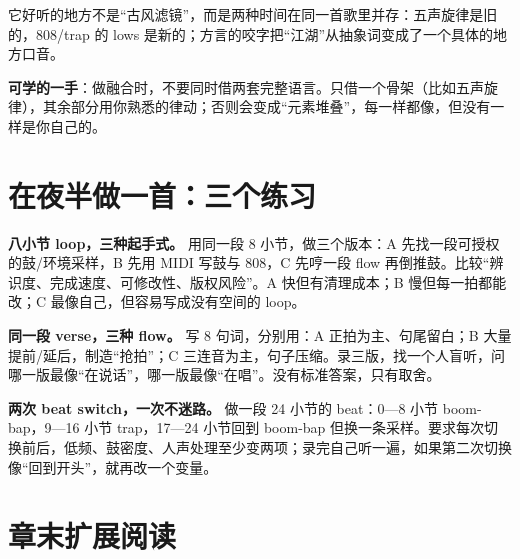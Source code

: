 它好听的地方不是“古风滤镜”，而是两种时间在同一首歌里并存：五声旋律是旧的，808/trap 的 lows 是新的；方言的咬字把“江湖”从抽象词变成了一个具体的地方口音。

\textbf{可学的一手}：做融合时，不要同时借两套完整语言。只借一个骨架（比如五声旋律），其余部分用你熟悉的律动；否则会变成“元素堆叠”，每一样都像，但没有一样是你自己的。

\section{在夜半做一首：三个练习}
\label{sec:hiphop-practice}

\begin{exercise}
\textbf{八小节 loop，三种起手式。} 用同一段 8 小节，做三个版本：A 先找一段可授权的鼓/环境采样，B 先用 MIDI 写鼓与 808，C 先哼一段 flow 再倒推鼓。比较“辨识度、完成速度、可修改性、版权风险”。A 快但有清理成本；B 慢但每一拍都能改；C 最像自己，但容易写成没有空间的 loop。
\end{exercise}

\begin{exercise}
\textbf{同一段 verse，三种 flow。} 写 8 句词，分别用：A 正拍为主、句尾留白；B 大量提前/延后，制造“抢拍”；C 三连音为主，句子压缩。录三版，找一个人盲听，问哪一版最像“在说话”，哪一版最像“在唱”。没有标准答案，只有取舍。
\end{exercise}

\begin{exercise}
\textbf{两次 beat switch，一次不迷路。} 做一段 24 小节的 beat：0—8 小节 boom-bap，9—16 小节 trap，17—24 小节回到 boom-bap 但换一条采样。要求每次切换前后，低频、鼓密度、人声处理至少变两项；录完自己听一遍，如果第二次切换像“回到开头”，就再改一个变量。
\end{exercise}

\section{章末扩展阅读}
\label{sec:hiphop-reading}

